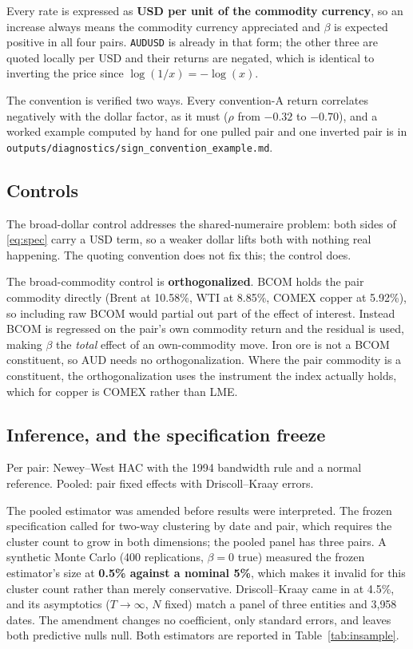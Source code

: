 \documentclass[11pt,a4paper]{article}
\begin{document}
Every rate is expressed as \textbf{USD per unit of the commodity currency}, so
an increase always means the commodity currency appreciated and $\beta$ is
expected positive in all four pairs. \texttt{AUDUSD} is already in that form;
the other three are quoted locally per USD and their returns are negated, which
is identical to inverting the price since $\log(1/x) = -\log(x)$.

The convention is verified two ways. Every convention-A return correlates
negatively with the dollar factor, as it must ($\rho$ from $-0.32$ to $-0.70$),
and a worked example computed by hand for one pulled pair and one inverted pair
is in \texttt{outputs/diagnostics/sign\_convention\_example.md}.

\subsection{Controls}

The broad-dollar control addresses the shared-numeraire problem: both sides of
\eqref{eq:spec} carry a USD term, so a weaker dollar lifts both with nothing
real happening. The quoting convention does not fix this; the control does.

The broad-commodity control is \textbf{orthogonalized}. BCOM holds the pair
commodity directly (Brent at 10.58\%, WTI at 8.85\%, COMEX copper at 5.92\%),
so including raw BCOM would partial out part of the effect of interest.
Instead BCOM is regressed on the pair's own commodity return and the residual is
used, making $\beta$ the \emph{total} effect of an own-commodity move. Iron ore
is not a BCOM constituent, so AUD needs no orthogonalization. Where the pair
commodity is a constituent, the orthogonalization uses the instrument the index
actually holds, which for copper is COMEX rather than LME.

\subsection{Inference, and the specification freeze}
\label{sec:freeze}

Per pair: Newey--West HAC with the 1994 bandwidth rule and a normal reference.
Pooled: pair fixed effects with Driscoll--Kraay errors.

The pooled estimator was amended before results were interpreted. The frozen
specification called for two-way clustering by date and pair, which requires the
cluster count to grow in both dimensions; the pooled panel has three pairs. A
synthetic Monte Carlo (400 replications, $\beta=0$ true) measured the frozen
estimator's size at \textbf{0.5\% against a nominal 5\%}, which makes it invalid
for this cluster count rather than merely conservative. Driscoll--Kraay came in
at 4.5\%, and its asymptotics ($T\to\infty$, $N$ fixed) match a panel of three
entities and 3{,}958 dates. The amendment changes no coefficient, only standard errors, and
leaves both predictive nulls null. Both estimators are reported in
Table~\ref{tab:insample}.
\end{document}
